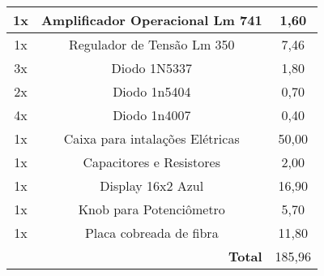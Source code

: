 \documentclass[journal]{IEEEtran}
\begin{document}
\begin{table}[!htpb]
\begin{tabular}{c|c|c|}
\multicolumn{1}{|c|}{1x}                  & Amplificador Operacional Lm 741                  & 1,60                                          \\ \hline
\multicolumn{1}{|c|}{1x}                  & Regulador de Tensão Lm 350                       & 7,46                                          \\ \hline
\multicolumn{1}{|c|}{3x}                  & Diodo 1N5337                                     & 1,80                                          \\ \hline
\multicolumn{1}{|c|}{2x}                  & Diodo 1n5404                                     & 0,70                                          \\ \hline
\multicolumn{1}{|c|}{4x}                  & Diodo 1n4007                                     & 0,40                                          \\ \hline
\multicolumn{1}{|c|}{1x}                  & Caixa para intalações Elétricas                  & 50,00                                         \\ \hline
\multicolumn{1}{|c|}{1x}                  & Capacitores e Resistores                         & 2,00                                          \\ \hline
\multicolumn{1}{|c|}{1x}                  & Display 16x2 Azul                                & 16,90                                         \\ \hline
\multicolumn{1}{|c|}{1x}                  & Knob para Potenciômetro                          & 5,70                                          \\ \hline
\multicolumn{1}{|c|}{1x}                  & Placa cobreada de fibra                          & 11,80                                         \\ \hline
\multicolumn{1}{l|}{}                     & \multicolumn{1}{r|}{\textbf{Total}}              & 185,96                                        \\ \cline{2-3} 
\end{tabular}
\end{table}
\end{document}
